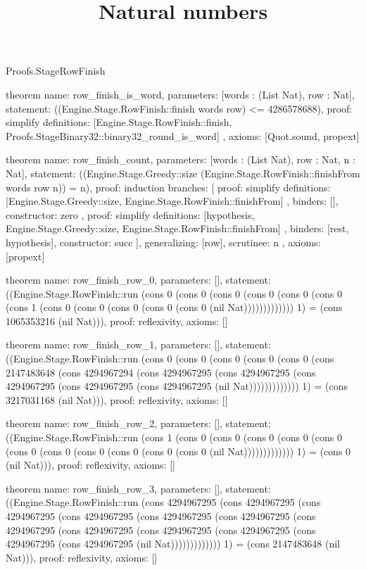 \begin{lexlean}{Proofs.StageRowFinish}
\title{Natural numbers}
\begin{semanticmodule}
theorem{
  name: row_finish_is_word,
  parameters: [words : (List Nat), row : Nat],
  statement: ((Engine.Stage.RowFinish::finish words row) <= 4286578688),
  proof: simplify{
    definitions: [Engine.Stage.RowFinish::finish, Proofs.StageBinary32::binary32_round_is_word]
  },
  axioms: [Quot.sound, propext]
}

theorem{
  name: row_finish_count,
  parameters: [words : (List Nat), row : Nat, n : Nat],
  statement: ((Engine.Stage.Greedy::size (Engine.Stage.RowFinish::finishFrom words row n)) = n),
  proof: induction{
    branches: [
      {
        proof: simplify{
          definitions: [Engine.Stage.Greedy::size, Engine.Stage.RowFinish::finishFrom]
        },
        binders: [],
        constructor: zero
      },
      {
        proof: simplify{
          definitions: [hypothesis, Engine.Stage.Greedy::size, Engine.Stage.RowFinish::finishFrom]
        },
        binders: [rest, hypothesis],
        constructor: succ
      }
    ],
    generalizing: [row],
    scrutinee: n
  },
  axioms: [propext]
}

theorem{
  name: row_finish_row_0,
  parameters: [],
  statement: ((Engine.Stage.RowFinish::run (cons 0 (cons 0 (cons 0 (cons 0 (cons 0 (cons 0 (cons 1 (cons 0 (cons 0 (cons 0 (cons 0 (cons 0 (nil Nat))))))))))))) 1) = (cons 1065353216 (nil Nat))),
  proof: reflexivity{},
  axioms: []
}

theorem{
  name: row_finish_row_1,
  parameters: [],
  statement: ((Engine.Stage.RowFinish::run (cons 0 (cons 0 (cons 0 (cons 0 (cons 0 (cons 2147483648 (cons 4294967294 (cons 4294967295 (cons 4294967295 (cons 4294967295 (cons 4294967295 (cons 4294967295 (nil Nat))))))))))))) 1) = (cons 3217031168 (nil Nat))),
  proof: reflexivity{},
  axioms: []
}

theorem{
  name: row_finish_row_2,
  parameters: [],
  statement: ((Engine.Stage.RowFinish::run (cons 1 (cons 0 (cons 0 (cons 0 (cons 0 (cons 0 (cons 0 (cons 0 (cons 0 (cons 0 (cons 0 (cons 0 (nil Nat))))))))))))) 1) = (cons 0 (nil Nat))),
  proof: reflexivity{},
  axioms: []
}

theorem{
  name: row_finish_row_3,
  parameters: [],
  statement: ((Engine.Stage.RowFinish::run (cons 4294967295 (cons 4294967295 (cons 4294967295 (cons 4294967295 (cons 4294967295 (cons 4294967295 (cons 4294967295 (cons 4294967295 (cons 4294967295 (cons 4294967295 (cons 4294967295 (cons 4294967295 (nil Nat))))))))))))) 1) = (cons 2147483648 (nil Nat))),
  proof: reflexivity{},
  axioms: []
}


\end{semanticmodule}
\end{lexlean}
